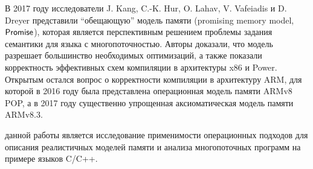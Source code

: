 В 2017 году исследователи J. Kang, C.-K. Hur, O. Lahav, V. Vafeiadis и D. Dreyer
представили ``обещающую'' модель памяти (promising memory model, $\mathsf{Promise}$), которая является перспективным
решением проблемы задания семантики для языка с многопоточностью. Авторы 
доказали, что модель разрешает большинство необходимых оптимизаций, а также показали корректность
эффективных схем компиляции в архитектуры x86 и Power. Открытым остался вопрос о корректности компиляции
в архитектуру ARM, для которой в 2016 году была представлена операционная модель памяти ARMv8 POP, а
в 2017 году существенно упрощенная аксиоматическая модель памяти ARMv8.3.





{\aim} данной работы является исследование применимости операционных
подходов для описания реалистичных моделей памяти и анализа
многопоточных программ на примере языков C/C++.

